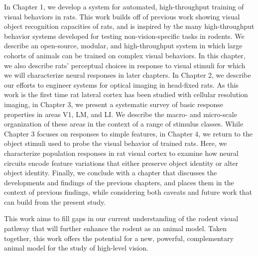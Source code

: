 In Chapter 1, we develop a system for automated, high-throughput training of visual behaviors in rats. This work builds off of previous work showing visual object recognition capacities of rats, and is inspired by the many high-throughput behavior systems developed for testing non-vision-specific tasks in rodents. We describe an open-source, modular, and high-throughput system in which large cohorts of animals can be trained on complex visual behaviors. In this chapter, we also describe rats' perceptual choices in response to visual stimuli for which we will characterize neural responses in later chapters. In Chapter 2, we describe our efforts to engineer systems for optical imaging in head-fixed rats. As this work is the first time rat lateral cortex has been studied with cellular resolution imaging, in Chapter 3, we present a systematic survey of basic response properties in areas V1, LM, and LI. We describe the macro- and micro-scale organization of these areas in the context of a range of stimulus classes. While Chapter 3 focuses on responses to simple features, in Chapter 4, we return to the object stimuli used to probe the visual behavior of trained rats. Here, we characterize population responses in rat visual cortex to examine how neural circuits encode feature variations that either preserve object identity or alter object identity. Finally, we conclude with a chapter that discusses the developments and findings of the previous chapters, and places them in the context of previous findings, while considering both caveats and future work that can build from the present study.

This work aims to fill gaps in our current understanding of the rodent visual pathway that will further enhance the rodent as an animal model. Taken together, this work offers the potential for a new, powerful, complementary animal model for the study of high-level vision.






